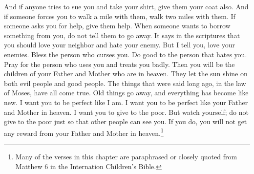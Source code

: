 And if anyone tries to sue you and take your shirt, give them your coat also.
\bverse \iffalse And whosoever shall compel thee to go a mile, go with him twain. \fi
And if someone forces you to walk a mile with them, walk two miles with them.
\bverse \iffalse Give to him that asketh thee, and from him that would borrow of thee turn not away. \fi
If someone asks you for help, give them help. When someone wants to borrow something from you, do not tell them to go away.
\bverse \iffalse And behold it is written also, that thou shalt love thy neighbor and hate thine enemy; \fi
It says in the scriptures that you should love your neighbor and hate your enemy.
\bverse \iffalse But I say unto you, love your enemies, bless them that curse you, do good to them that hate you, and pray for them who despitefully use you and persecute you; \fi
But I tell you, love your enemies. Bless the person who curses you. Do good to the person that hates you. Pray for the person who uses you and treats you badly.
\bverse \iffalse That ye may be the children of your Father who is in heaven; for he maketh his sun to rise on the evil and on the good. \fi
Then you will be the children of your Father and Mother who are in heaven. They let the sun shine on both evil people and good people.
\bverse \iffalse Therefore those things which were of old time, which were under the law, in me are all fulfilled. \fi
The things that were said long ago, in the law of Moses, have all come true.
\bverse \iffalse Old things are done away, and all things have become new. \fi
Old things go away, and everything has become like new.
\bverse \iffalse Therefore I would that ye should be perfect even as I, or your Father who is in heaven is perfect. \fi
I want you to be perfect like I am. I want you to be perfect like your Father and Mother in heaven.
\bchapter
\bverse \iffalse Verily, verily, I say that I would that ye should do alms unto the poor; but take heed that ye do not your alms before men to be seen of them; otherwise ye have no reward of your Father who is in heaven. \fi
I want you to give to the poor. But watch yourself; do not give to the poor just so that other people can see you. If you do, you will not get any reward from your Father and Mother in heaven.\footnote{Many of the verses in this chapter are paraphrased or closely quoted from Matthew 6 in the Internation Children's Bible.}
\bverse \iffalse Therefore, when ye shall do your alms do not sound a trumpet before you, as will hypocrites do in the synagogues and in the streets, that they may have glory of men. Verily I say unto you, they have their reward. \fi

